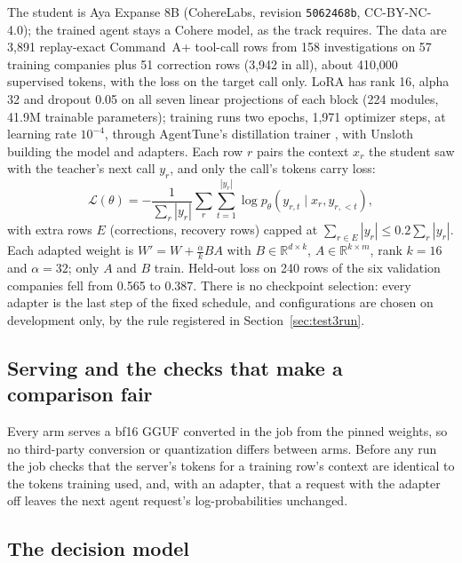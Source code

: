 \documentclass[11pt]{article}
\begin{document}
The student is Aya Expanse 8B (CohereLabs, revision \texttt{5062468b}, CC-BY-NC-4.0); the trained agent stays a Cohere
model, as the track requires. The data are 3,891 replay-exact Command~A+ tool-call rows from 158 investigations on 57
training companies plus 51 correction rows (3,942 in all), about 410,000 supervised tokens, with the loss on the target call only.
LoRA \citep{hu2022lora} has rank 16, alpha 32 and dropout 0.05 on all seven linear projections of each block (224
modules, 41.9M trainable parameters); training runs two epochs, 1,971 optimizer steps, at learning rate $10^{-4}$,
through AgentTune's distillation trainer \citep{lexsi_agenttune,hinton2015distilling}, with Unsloth building the model
and adapters. Each row $r$ pairs the context $x_r$ the student saw with the teacher's next call $y_r$, and only the call's
tokens carry loss:
\begin{equation}
\mathcal{L}(\theta) = -\frac{1}{\sum_r |y_r|} \sum_r \sum_{t=1}^{|y_r|} \log p_\theta\!\left(y_{r,t} \mid x_r, y_{r,<t}\right),
\end{equation}
with extra rows $E$ (corrections, recovery rows) capped at $\sum_{r \in E} |y_r| \le 0.2 \sum_r |y_r|$. Each adapted
weight is $W' = W + \tfrac{\alpha}{k} BA$ with $B \in \mathbb{R}^{d \times k}$, $A \in \mathbb{R}^{k \times m}$, rank
$k = 16$ and $\alpha = 32$; only $A$ and $B$ train. Held-out loss on 240 rows of the six validation companies fell from 0.565 to 0.387. There is no
checkpoint selection: every adapter is the last step of the fixed schedule, and configurations are chosen on
development only, by the rule registered in Section~\ref{sec:test3run}.

\subsection{Serving and the checks that make a comparison fair}

Every arm serves a bf16 GGUF converted in the job from the pinned weights, so no third-party conversion or
quantization differs between arms. Before any run the job checks that the server's tokens for a training row's
context are identical to the tokens training used, and, with an adapter, that a request with the adapter off leaves
the next agent request's log-probabilities unchanged.

\subsection{The decision model}
\label{sec:decide-method}
\end{document}

